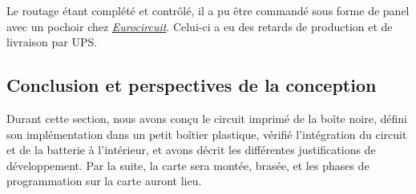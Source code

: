 \begin{table}[!h]
	\centering
	\caption{Description des éléments du routage.}
	\label{tab:descr-routage}
\end{table}

Le routage étant complété et contrôlé, il a pu être commandé sous forme de panel avec un pochoir chez \href{https://www.eurocircuits.com/}{\textit{Eurocircuit}}. Celui-ci a eu des retards de production et de livraison par UPS.

\clearpage

\subsection{Conclusion et perspectives de la conception}

Durant cette section, nous avons conçu le circuit imprimé de la boîte noire, défini son implémentation dans un petit boîtier plastique, vérifié l'intégration du circuit et de la batterie à l'intérieur, et avons décrit les différentes justifications de développement. Par la suite, la carte sera montée, brasée, et les phases de programmation sur la carte auront lieu.


